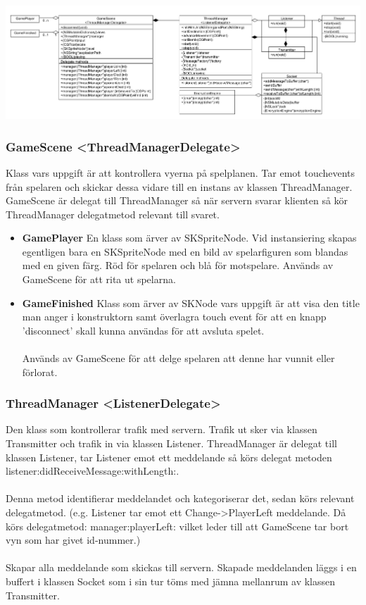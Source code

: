 \documentclass[10pt, titlepage, oneside, a4paper]{article}
\begin{document}
    		\newpage
    		\includegraphics[scale=.25]{./png/ClientClassDiagram.png}
    		\subsubsection{GameScene <ThreadManagerDelegate>}
    		Klass vars uppgift är att kontrollera vyerna på spelplanen. Tar emot touchevents från spelaren och skickar dessa vidare till en instans av klassen ThreadManager. GameScene är delegat till ThreadManager så när servern svarar klienten så kör ThreadManager delegatmetod relevant till svaret.
    		\begin{itemize}
    			\item\textbf{GamePlayer}
    			En klass som ärver av SKSpriteNode. Vid instansiering skapas egentligen bara en SKSpriteNode med en bild av spelarfiguren som blandas med en given färg. Röd för spelaren och blå för motspelare. Används av GameScene för att rita ut spelarna.
    			
    			\item\textbf{GameFinished} 
    			Klass som ärver av SKNode vars uppgift är att visa den title man anger i konstruktorn samt överlagra touch event för att en knapp 'disconnect' skall kunna användas för att avsluta spelet.\\\\Används av GameScene för att delge spelaren att denne har vunnit eller förlorat.
    			
    		\end{itemize}
    		\subsubsection{ThreadManager <ListenerDelegate>}
    		Den klass som kontrollerar trafik med servern. Trafik ut sker via klassen Transmitter och trafik in via klassen Listener. ThreadManager är delegat till klassen Listener, tar Listener emot ett meddelande så körs delegat metoden listener:didReceiveMessage:withLength:.\\\\Denna metod identifierar meddelandet och kategoriserar det, sedan körs relevant delegatmetod. (e.g. Listener tar emot ett Change->PlayerLeft meddelande. Då körs delegatmetod: manager:playerLeft: vilket leder till att GameScene tar bort vyn som har givet id-nummer.)\\\\Skapar alla meddelande som skickas till servern. Skapade meddelanden läggs i en buffert i klassen Socket som i sin tur töms med jämna mellanrum av klassen Transmitter.
    		
\end{document}
